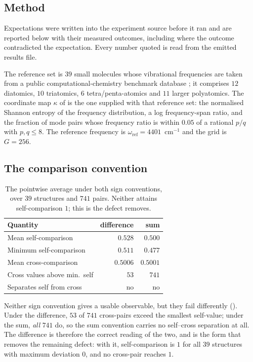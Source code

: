 \documentclass[11pt,twocolumn,a4paper]{article}
\theoremstyle{upthm}
\theoremstyle{definition}
\theoremstyle{remark}
\newcommand{\wref}{\omega_{\mathrm{ref}}}
\begin{document}
\subsection{Method}

Expectations were written into the experiment source before it ran and
are reported below with their measured outcomes, including where the
outcome contradicted the expectation. Every number quoted is read from
the emitted results file.

The reference set is $39$ small molecules whose vibrational frequencies
are taken from a public computational-chemistry benchmark database
\citep{cccbdb}; it comprises $12$ diatomics, $10$ triatomics, $6$
tetra/penta-atomics and $11$ larger polyatomics. The coordinate map
$\kappa$ of  is the one supplied with that reference
set: the normalised Shannon entropy of the frequency distribution, a
log frequency-span ratio, and the fraction of mode pairs whose frequency
ratio is within $0.05$ of a rational $p/q$ with $p,q\le8$. The reference
frequency is $\wref=4401$~cm$^{-1}$ and the grid is $G=256$.

\subsection{The comparison convention}
\label{sec:convention}

\begin{table}[htbp]
\centering\small
\caption{The pointwise average under both sign conventions, over $39$
structures and $741$ pairs. Neither attains self-comparison $1$; this is
the defect  removes.}
\label{tab:convention}
\begin{tabular}{@{}lrr@{}}
\toprule
Quantity & difference & sum\\
\midrule
Mean self-comparison & $0.528$ & $0.500$\\
Minimum self-comparison & $0.511$ & $0.477$\\
Mean cross-comparison & $0.5006$ & $0.5001$\\
Cross values above min.\ self & $53$ & $741$\\
Separates self from cross & no & no\\
\bottomrule
\end{tabular}
\end{table}

Neither sign convention gives a usable observable, but they fail
differently (). Under the difference, $53$ of $741$
cross-pairs exceed the smallest self-value; under the sum, \emph{all}
$741$ do, so the sum convention carries no self--cross separation at all.
The difference is therefore the correct reading of the two, and
 is the form that removes the remaining defect: with it,
self-comparison is $1$ for all $39$ structures with maximum deviation
$0$, and no cross-pair reaches $1$.
\end{document}

